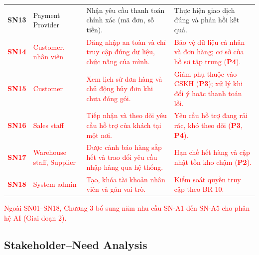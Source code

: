 \documentclass[12pt,a4paper,oneside]{report}
\newif\ifmark \marktrue
\newcommand{\chg}[1]{\ifmark\textcolor{red}{#1}\else #1\fi}
\begin{document}
\begin{longtable}{p{1.6cm}p{3cm}p{6cm}p{5.4cm}}
\textbf{SN13} & Payment Provider & Nhận yêu cầu thanh toán chính xác (mã đơn, số tiền). & Thực hiện giao dịch đúng và phản hồi kết quả. \\
\chg{\textbf{SN14}} & \chg{Customer, nhân viên} & \chg{Đăng nhập an toàn và chỉ truy cập đúng dữ liệu, chức năng của mình.} & \chg{Bảo vệ dữ liệu cá nhân và đơn hàng; cơ sở của hồ sơ tập trung (\textbf{P4}).} \\
\chg{\textbf{SN15}} & \chg{Customer} & \chg{Xem lịch sử đơn hàng và chủ động hủy đơn khi chưa đóng gói.} & \chg{Giảm phụ thuộc vào CSKH (\textbf{P3}); xử lý khi đổi ý hoặc thanh toán lỗi.} \\
\chg{\textbf{SN16}} & \chg{Sales staff} & \chg{Tiếp nhận và theo dõi yêu cầu hỗ trợ của khách tại một nơi.} & \chg{Yêu cầu hỗ trợ đang rải rác, khó theo dõi (\textbf{P3}, \textbf{P4}).} \\
\chg{\textbf{SN17}} & \chg{Warehouse staff, Supplier} & \chg{Được cảnh báo hàng sắp hết và trao đổi yêu cầu nhập hàng qua hệ thống.} & \chg{Hạn chế hết hàng và cập nhật tồn kho chậm (\textbf{P2}).} \\
\chg{\textbf{SN18}} & \chg{System admin} & \chg{Tạo, khóa tài khoản nhân viên và gán vai trò.} & \chg{Kiểm soát quyền truy cập theo BR-10.} \\
\end{longtable}

\chg{Ngoài SN01--SN18, Chương 3 bổ sung năm nhu cầu SN-A1 đến SN-A5 cho phân hệ AI (Giai đoạn 2).}

\subsection{Stakeholder--Need Analysis}
\end{document}
